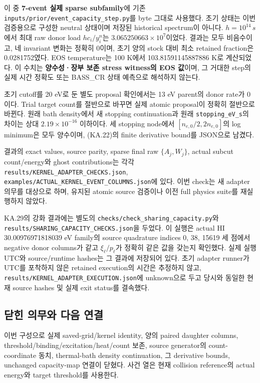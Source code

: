 이 중 \textbf{7-event 실제 sparse subfamily}에 기존 \nolinkurl{inputs/prior/event_capacity_step.py}를 byte 그대로 사용했다. 초기 상태는 이번 검증용으로 구성한 neutral 상태이며 저장된 historical spectrum이 아니다. \(h=10^{14}\,s\)에서 최대 raw donor load \(hc_i/y_i^n\)는 \(3.065250663\times10^7\)이었다. 결과는 모두 비음수이고, 네 invariant 변화는 정확히 0이며, 초기 양의 stock 대비 최소 retained fraction은 0.0281752였다. EOS temperature는 100 K에서 103.81591145887886 K로 계산되었다. 이 수치는 \textbf{양수성·장부 보존 stress witness의 EOS 값}이며, 그 거대한 step의 실제 시간 정확도 또는 BASS\_CR 상태 예측으로 해석하지 않는다.

초기 cutoff를 20 eV로 둔 별도 proposal 확인에서는 13 eV parent의 donor rate가 0이다. Trial target count를 절반으로 바꾸면 실제 atomic proposal이 정확히 절반으로 바뀐다. 원래 bath density에서 새 stopping continuation과 원래 \texttt{stopping\_eV\_s}의 차이는 상대 \(2.19\times10^{-16}\) 이하이다. 세 stopping node에서 \([n_{e,0}/2,2n_{e,0}]\)의 log minimum은 모두 양수이며, (KA.22)의 finite derivative bound를 JSON으로 남겼다.

결과의 exact values, source parity, sparse final raw \(\{A_j,W_j\}\), actual subcut count/energy와 ghost contributions는 각각 \nolinkurl{results/KERNEL_ADAPTER_CHECKS.json}, \nolinkurl{examples/ACTUAL_KERNEL_EVENT_COLUMNS.json}에 있다. 이번 check는 새 adapter 의무를 대상으로 하며, 유지된 atomic source 검증이나 이전 full physics suite를 재실행하지 않았다.

KA.29의 강화 결과에는 별도의 \nolinkurl{checks/check_sharing_capacity.py}와 \nolinkurl{results/SHARING_CAPACITY_CHECKS.json}을 두었다. 이 실행은 actual HI 30.00976971818039 eV family의 source quadrature indices 0, 38, 15619 세 점에서 negative donor columns가 같고 \(\xi_\ell/p_\ell\)가 정확히 같은 값을 갖는지 확인했다. 실제 실행 UTC와 source/runtime hashes는 그 결과에 저장되어 있다. 초기 adapter runner가 UTC를 포착하지 않은 retained execution의 시간은 추정하지 않고, \nolinkurl{results/KERNEL_ADAPTER_EXECUTION.json}에 unknown으로 두고 당시와 동일한 현재 source hashes 및 실제 exit status를 결속했다.

\hypertarget{uxb2ebuxd78c-uxc758uxbb34uxc640-uxb2e4uxc74c-uxc5f0uxacb0}{%
\subsection{닫힌 의무와 다음 연결}\label{uxb2ebuxd78c-uxc758uxbb34uxc640-uxb2e4uxc74c-uxc5f0uxacb0}}

이번 구성으로 실제 saved-grid/kernel identity, 양의 paired daughter columns, threshold/binding/excitation/heat/count 보존, source generator의 count-coordinate 동치, thermal-bath density continuation, 그 derivative bounds, unchanged capacity-map 연결이 닫혔다. 사건 열은 현재 collision reference의 actual energy와 target threshold를 사용한다.

